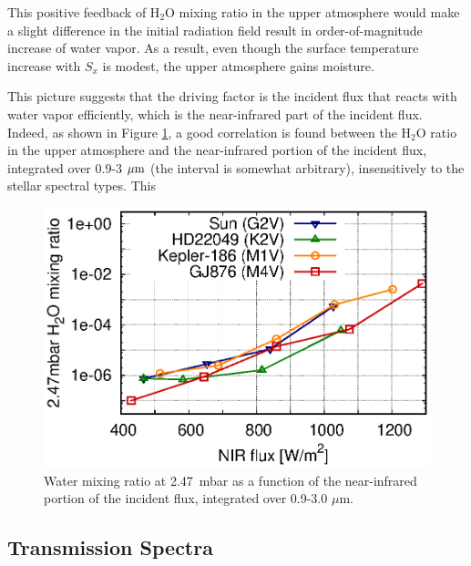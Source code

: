 \documentclass[11pt,numberedappendix,twocolappendix,]{emulateapj}
\def\water{H$_2$O }
\def\preslevel{2.47}
\begin{document}
This positive feedback of \water mixing ratio in the upper atmosphere would make a slight difference in the initial radiation field result in order-of-magnitude increase of water vapor. 
As a result, even though the surface temperature increase with $S_x$ is modest, the upper atmosphere gains moisture.  

This picture suggests that the driving factor is the incident flux that reacts with water vapor efficiently, which is the near-infrared part of the incident flux. 
Indeed, as shown in Figure \ref{fig:qOH0TLS_FNIR_xH2O_247mbar}, a good correlation is found between the \water ratio in the upper atmosphere and the near-infrared portion of the incident flux, integrated over 0.9-3 $\mu {\rm m}$ (the interval is somewhat arbitrary), insensitively to the stellar spectral types. 
This 

\begin{figure}[!h]
    \begin{center}
    \includegraphics[width=\hsize]{fig/AqOH0TLS_FNIR_xH2O_247mbar.eps}
    \end{center}
\caption{Water mixing ratio at \preslevel ~mbar as a function of the near-infrared portion of the incident flux, integrated over 0.9-3.0 $\mu $m. }                                                                                                             
\label{fig:qOH0TLS_FNIR_xH2O_247mbar}
\end{figure}

\subsection{Transmission Spectra}
\label{ss:result_TransmissionSpectra}
\end{document}
